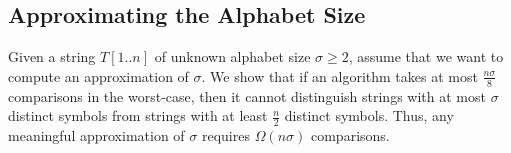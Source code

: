 \iffalse
\begin{lemma}
Let $\Gamma$
be the number of distinct colors in the conflict graph, let $m$
be the number of colorless nodes, and let $d_{\max}$ be the maximum degree of any colorless node. Then for every $s \in \{\max\{\Gamma, d_{\max} + 1\}, \dots, \max\{\Gamma + m, d_{\max} + 1\}$, some string in $\mathcal T$ contains exactly $\sigma$ distinct symbols.
\end{lemma}
\begin{proof}
In order to obtain a string with $\Gamma + d_{\max} + 1$ distinct colors, we simply color the colorless nodes in $d_{\max} + 1$ previously unused colors (which is easily possible because we can always avoid the colors of the at most $d_{\max}$ adjacent nodes). It is easy to see that instead of using only $d_{\max} + 1$ new colors, we could just as well use any larger number of new colors, but at most $m$.
\end{proof}
\fi
%


\def\sigmaapprox{\tilde{\sigma}}


\subsection{Approximating the Alphabet Size}
\label{square:sec:loweralphaapprox}



Given a string $T[1..n]$ of unknown alphabet size $\sigma \geq 2$, 
assume that we want to compute an approximation of $\sigma$.
We show that if an algorithm takes at most $\frac{n\sigma} 8$ comparisons in the worst-case, then it cannot distinguish strings with at most $\sigma$ distinct symbols from strings with at least $\frac n 2$ distinct symbols.
Thus, any meaningful approximation of $\sigma$ requires $\Omega(n\sigma)$ comparisons.

